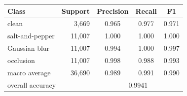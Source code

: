 \begin{tabular}{lrccc}
\toprule
Class & Support & Precision & Recall & F1 \\
\midrule
clean & 3,669 & 0.965 & 0.977 & 0.971 \\
salt-and-pepper & 11,007 & 1.000 & 1.000 & 1.000 \\
Gaussian blur & 11,007 & 0.994 & 1.000 & 0.997 \\
occlusion & 11,007 & 0.998 & 0.988 & 0.993 \\
\midrule
macro average & 36,690 & 0.989 & 0.991 & 0.990 \\
\multicolumn{2}{l}{overall accuracy} & \multicolumn{3}{c}{0.9941} \\
\bottomrule
\end{tabular}
